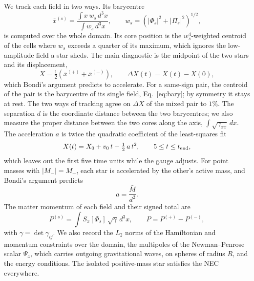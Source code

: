 \documentclass[twocolumn,floatfix,aps,prd,superscriptaddress,nofootinbib]{revtex4-2}
\begin{document}
We track each field in two ways. Its barycentre
\begin{equation}
\bar x^{(s)}=\frac{\int x\,w_s\,d^3x}{\int w_s\,d^3x},\qquad w_s=\left(|\Phi_s|^2+|\Pi_s|^2\right)^{1/2},
\label{eq:bary}
\end{equation}
is computed over the whole domain. Its core position is the $w_s^4$-weighted centroid of the cells where $w_s$ exceeds a quarter of its maximum, which ignores the low-amplitude field a star sheds. The main diagnostic is the midpoint of the two stars and its displacement,
\begin{equation}
X=\tfrac12\left(\bar x^{(+)}+\bar x^{(-)}\right),\qquad \Delta X(t)=X(t)-X(0),
\label{eq:mid}
\end{equation}
which Bondi's argument predicts to accelerate. For a same-sign pair, the centroid of the pair is the barycentre of its single field, Eq.~\eqref{eq:bary}; by symmetry it stays at rest. The two ways of tracking agree on $\Delta X$ of the mixed pair to $1\%$. The separation $d$ is the coordinate distance between the two barycentres; we also measure the proper distance between the two cores along the axis, $\int\sqrt{\gamma_{xx}}\,dx$. The acceleration $a$ is twice the quadratic coefficient of the least-squares fit
\begin{equation}
X(t)=X_0+v_0\,t+\tfrac12\,a\,t^2,\qquad 5\le t\le t_{\rm end},
\label{eq:fit}
\end{equation}
which leaves out the first five time units while the gauge adjusts. For point masses with $|M_-|=M_+$, each star is accelerated by the other's active mass, and Bondi's argument predicts
\begin{equation}
a=\frac{\bar M}{d^2}.
\label{eq:bondilaw}
\end{equation}
The matter momentum of each field and their signed total are
\begin{equation}
P^{(s)}=\int S_x[\Phi_s]\,\sqrt{\gamma}\,d^3x,\qquad P=P^{(+)}-P^{(-)},
\label{eq:momentum}
\end{equation}
with $\gamma=\det\gamma_{ij}$. We also record the $L_2$ norms of the Hamiltonian and momentum constraints over the domain, the multipoles of the Newman--Penrose scalar $\Psi_4$, which carries outgoing gravitational waves, on spheres of radius $R$, and the energy conditions. The isolated positive-mass star satisfies the NEC everywhere.
\end{document}
